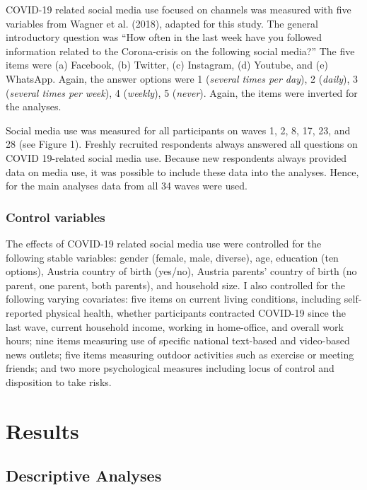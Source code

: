 \documentclass[
  man,mask,floatsintext]{apa7}
\begin{document}
COVID-19 related social media use focused on channels was measured with five variables from Wagner et al. (2018), adapted for this study.
The general introductory question was ``How often in the last week have you followed information related to the Corona-crisis on the following social media?''
The five items were (a) Facebook, (b) Twitter, (c) Instagram, (d) Youtube, and (e) WhatsApp.
Again, the answer options were 1 (\emph{several times per day}), 2 (\emph{daily}), 3 (\emph{several times per week}), 4 (\emph{weekly}), 5 (\emph{never}).
Again, the items were inverted for the analyses.

Social media use was measured for all participants on waves 1, 2, 8, 17, 23, and 28 (see Figure 1).
Freshly recruited respondents always answered all questions on COVID 19-related social media use.
Because new respondents always provided data on media use, it was possible to include these data into the analyses.
Hence, for the main analyses data from all 34 waves were used.

\subsubsection{Control variables}\label{control-variables}

The effects of COVID-19 related social media use were controlled for the following stable variables:
gender (female, male, diverse), age, education (ten options), Austria country of birth (yes/no), Austria parents' country of birth (no parent, one parent, both parents), and household size.
I also controlled for the following varying covariates: five items on current living conditions, including self-reported physical health, whether participants contracted COVID-19 since the last wave, current household income, working in home-office, and overall work hours; nine items measuring use of specific national text-based and video-based news outlets; five items measuring outdoor activities such as exercise or meeting friends; and two more psychological measures including locus of control and disposition to take risks.

\section{Results}\label{results}

\subsection{Descriptive Analyses}\label{descriptive-analyses}
\end{document}
